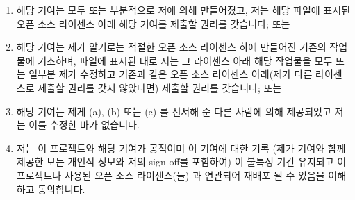 \begin{enumerate}[label={(\alph*)}]
\item	해당 기여는 모두 또는 부분적으로 저에 의해 만들어졌고, 저는 해당 파일에
	표시된 오픈 소스 라이센스 아래 해당 기여를 제출할 권리를 갖습니다; 또는

\iffalse
\item	The contribution was created in whole or in part
	by me and I have the right to submit it under
	the open source license indicated in the file; or
\fi

\item	해당 기여는 제가 알기로는 적절한 오픈 소스 라이센스 하에 만들어진
	기존의 작업물에 기초하며, 파일에 표시된 대로 저는 그 라이센스 아래 해당
	작업물을 모두 또는 일부분 제가 수정하고 기존과 같은 오픈 소스 라이센스
	아래(제가 다른 라이센스로 제출할 권리를 갖지 않았다면) 제출할 권리를
	갖습니다; 또는

\iffalse
\item	The contribution is based upon previous work
	that, to the best of my knowledge, is covered
	under an appropriate open source License and I
	have the right under that license to submit that
	work with modifications, whether created in whole
	or in part by me, under the same open source
	license (unless I am permitted to submit under
	a different license), as indicated in the file; or
\fi

\item	해당 기여는 제게 (a), (b) 또는 (c) 를 선서해 준 다른 사람에 의해
	제공되었고 저는 이를 수정한 바가 없습니다.

\iffalse
\item	The contribution was provided directly to me by
	some other person who certified (a), (b) or (c)
	and I have not modified it.
\fi

\item	저는 이 프로젝트와 해당 기여가 공적이며 이 기여에 대한 기록 (제가
	기여와 함께 제공한 모든 개인적 정보와 저의 sign-off를 포함하여) 이
	불특정 기간 유지되고 이 프로젝트나 사용된 오픈 소스 라이센스(들) 과
	연관되어 재배포 될 수 있음을 이해하고 동의합니다.

\iffalse
\item	I understand and agree that this project and the
	contribution are public and that a record of the
	contribution (including all personal information
	I submit with it, including my sign-off) is
	maintained indefinitely and may be redistributed
	consistent with this project or the open source
	license(s) involved.
\fi
\end{enumerate}

